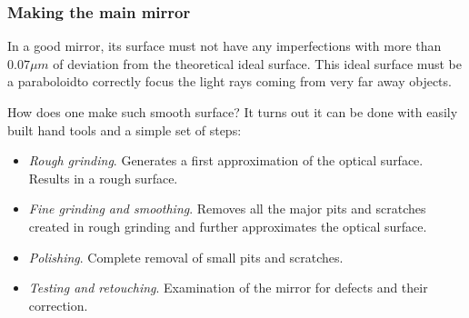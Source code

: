 \documentclass{beamer}
\begin{document}
\begin{frame}
\frametitle{Making the main mirror}
In a good mirror, its surface must not have any imperfections with more than $0.07 \mu m$ of deviation from the theoretical ideal surface.
This ideal surface must be a paraboloid\footnotemark to correctly focus the light rays coming from very far away objects.

How does one make such smooth surface? It turns out it can be done with easily built hand tools and a simple set of steps:

\begin{itemize}
\item \textit{Rough grinding}. Generates a first approximation of the optical surface. Results in a rough surface.
\item \textit{Fine grinding and smoothing}. Removes all the major pits and scratches created in rough grinding and further approximates the optical surface.
\item \textit{Polishing}. Complete removal of small pits and scratches.
\item \textit{Testing and retouching}. Examination of the mirror for defects and their correction.
\end{itemize}
\end{frame}
\end{document}
